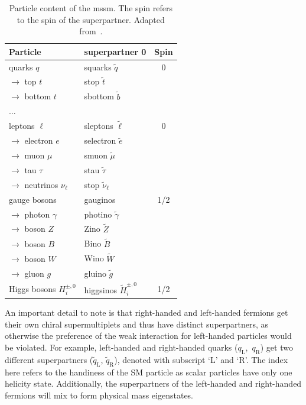 \begin{table}
	\centering
	\small
	\setlength\heavyrulewidth{0.2ex}
	\caption{Particle content of the \gls{mssm}. The spin refers to the spin of the superpartner. Adapted from~\cite{Bustamante:2009us}.}
	\begin{tabular} {l l c}
		
		\toprule
		Particle & superpartner 0 & Spin \\ 
		\midrule 
		quarks $q$ & squarks $\tilde{q}$ & 0 \\
		$\rightarrow$ top $t$ & stop $\tilde{t}$ & \\
		$\rightarrow$ bottom $t$ & sbottom $\tilde{b}$ & \\
		$\dots$ & & \\
		leptons $\ell$ & sleptons $\tilde{\ell}$ & 0 \\
		$\rightarrow$ electron $e$ & selectron $\tilde{e}$ & \\
		$\rightarrow$ muon $\mu$ & smuon $\tilde{\mu}$ & \\
		$\rightarrow$ tau $\tau$ & stau $\tilde{\tau}$ & \\
		$\rightarrow$ neutrinos $\nu_\ell$ & stop $\tilde{\nu}_\ell$ & \\
		\midrule
		gauge bosons & gauginos & 1/2 \\
		$\rightarrow$ photon $\gamma$ & photino $\tilde{\gamma}$ & \\
		$\rightarrow$ boson $Z$ & Zino $\tilde{Z}$ & \\
		$\rightarrow$ boson $B$ & Bino $\tilde{B}$ & \\
		$\rightarrow$ boson $W$ & Wino $\tilde{W}$ & \\
		$\rightarrow$ gluon $g$ & gluino $\tilde{g}$ & \\
		\midrule
		Higgs bosons $H^{\pm,0}_i$ & higgsinos $\tilde{H}^{\pm,0}_i$ & 1/2 \\
		\bottomrule
	\end{tabular}\vspace{3mm}
	\label{tab:particles_MSSM}   
\end{table}

An important detail to note is that right-handed and left-handed fermions get their own chiral supermultiplets and thus have distinct superpartners, as otherwise the preference of the weak interaction for left-handed particles would be violated. 
For example, left-handed and right-handed quarks \mbox{($q_\mathrm{L}$, $q_\mathrm{R}$)} get two different superpartners ($\tilde{q}_\mathrm{L}$, $\tilde{q}_\mathrm{R}$), denoted with subscript `L' and `R'.
The index here refers to the handiness of the SM particle as scalar particles have only one helicity state. Additionally, the superpartners of the left-handed and right-handed fermions will mix to form physical mass eigenstates.

